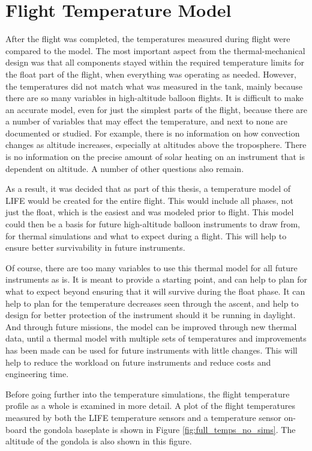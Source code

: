 \section{Flight Temperature Model}\label{flight_temp_model}
After the flight was completed, the temperatures measured during flight were compared to the model. The most important aspect from the thermal-mechanical design was that all components stayed within the required temperature limits for the float part of the flight, when everything was operating as needed. However, the temperatures did not match what was measured in the tank, mainly because there are so many variables in high-altitude balloon flights. It is difficult to make an accurate model, even for just the simplest parts of the flight, because there are a number of variables that may effect the temperature, and next to none are documented or studied. For example, there is no information on how convection changes as altitude increases, especially at altitudes above the troposphere. There is no information on the precise amount of solar heating on an instrument that is dependent on altitude. A number of other questions also remain.

As a result, it was decided that as part of this thesis, a temperature model of LIFE would be created for the entire flight. This would include all phases, not just the float, which is the easiest and was modeled prior to flight. This model could then be a basis for future high-altitude balloon instruments to draw from, for thermal simulations and what to expect during a flight. This will help to ensure better survivability in future instruments.

Of course, there are too many variables to use this thermal model for all future instruments as is. It is meant to provide a starting point, and can help to plan for what to expect beyond ensuring that it will survive during the float phase. It can help to plan for the temperature decreases seen through the ascent, and help to design for better protection of the instrument should it be running in daylight. And through future missions, the model can be improved through new thermal data, until a thermal model with multiple sets of temperatures and improvements has been made can be used for future instruments with little changes. This will help to reduce the workload on future instruments and reduce costs and engineering time. 

Before going further into the temperature simulations, the flight temperature profile as a whole is examined in more detail. A plot of the flight temperatures measured by both the LIFE temperature sensors and a temperature sensor on-board the gondola baseplate is shown in Figure \ref{fig:full_temps_no_sims}. The altitude of the gondola is also shown in this figure.

